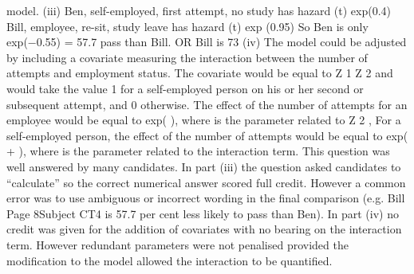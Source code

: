 model.
(iii)
Ben, self-employed, first attempt, no study has hazard  (t) exp(0.4)
Bill, employee, re-sit, study leave has hazard  (t) exp (0.95)
So Ben is only exp(−0.55) = 57.7%
pass than Bill.
OR
Bill is 73%
(iv)
The model could be adjusted by including a covariate measuring the interaction
between the number of attempts and employment status.
The covariate would be equal to Z 1 Z 2 and would take the value 1 for a self-employed
person on his or her second or subsequent attempt, and 0 otherwise.
The effect of the number of attempts for an employee would be equal to exp( ),
where  is the parameter related to Z 2 , For a self-employed person, the effect of the
number of attempts would be equal to exp( +  ), where  is the parameter related
to the interaction term.
This question was well answered by many candidates. In part (iii) the question asked
candidates to “calculate” so the correct numerical answer scored full credit. However a
common error was to use ambiguous or incorrect wording in the final comparison (e.g. Bill
Page 8Subject CT4 %
is 57.7 per cent less likely to pass than Ben). In part (iv) no credit was given for the addition
of covariates with no bearing on the interaction term. However redundant parameters were
not penalised provided the modification to the model allowed the interaction to be quantified.


\newpage

